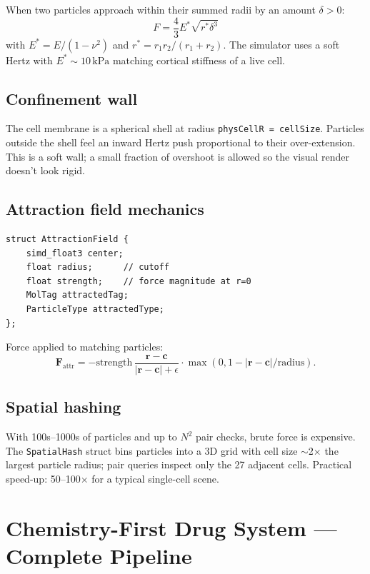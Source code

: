 \documentclass[11pt,letterpaper,twoside,openany]{book}
\newcommand{\code}[1]{\texttt{#1}}
\begin{document}
When two particles approach within their summed radii by an amount
$\delta > 0$:
\begin{equation}
  F = \frac{4}{3}E^*\sqrt{r^*\delta^3}
\end{equation}
with $E^* = E/(1-\nu^2)$ and $r^* = r_1 r_2/(r_1+r_2)$. The
simulator uses a soft Hertz with $E^*\sim 10\,\text{kPa}$ matching
cortical stiffness of a live cell.

\section{Confinement wall}

The cell membrane is a spherical shell at radius
\code{physCellR = cellSize}. Particles outside the shell feel an
inward Hertz push proportional to their over-extension. This is a
soft wall; a small fraction of overshoot is allowed so the visual
render doesn't look rigid.

\section{Attraction field mechanics}

\begin{lstlisting}
struct AttractionField {
    simd_float3 center;
    float radius;      // cutoff
    float strength;    // force magnitude at r=0
    MolTag attractedTag;
    ParticleType attractedType;
};
\end{lstlisting}
Force applied to matching particles:
\begin{equation}
  \mathbf{F}_{\text{attr}} = -\text{strength}\,\frac{\mathbf{r} - \mathbf{c}}{|\mathbf{r}-\mathbf{c}|+\epsilon}\cdot\max(0, 1 - |\mathbf{r}-\mathbf{c}|/\text{radius}).
\end{equation}

\section{Spatial hashing}

With 100s--1000s of particles and up to $N^2$ pair checks, brute
force is expensive. The \code{SpatialHash} struct bins particles
into a 3D grid with cell size $\sim$2$\times$ the largest particle
radius; pair queries inspect only the 27 adjacent cells. Practical
speed-up: 50--100$\times$ for a typical single-cell scene.

\chapter{Chemistry-First Drug System --- Complete Pipeline}
\label{ch:drug-deep}
\end{document}
